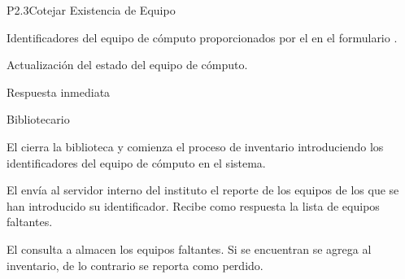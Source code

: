 \begin{Proceso}{P2.3}{Cotejar Existencia de Equipo}
   { %
  	\begin{UClist}
  		\UCli Identificadores del equipo de cómputo proporcionados por el  en el formulario . 
    \end {UClist}
  }
  
   { %
  }

   { %
    \begin{UClist}
		\UCli	Actualización del estado del equipo de cómputo.
    \end{UClist}
  }

   { %
  }

   { %
    \begin{UClist}
      \UCli Respuesta inmediata
    \end{UClist}
  }
   { %
  }


\end{Proceso}
\begin{PDescripcion}

  \Ppaso Bibliotecario
	\begin{enumerate}
		\Ppaso[\itarea]  El  cierra la biblioteca y comienza el proceso de inventario introduciendo los identificadores del equipo de cómputo en el sistema.
		
		\Ppaso[\itarea]  El  envía al servidor interno del instituto el reporte de los equipos de los que se han introducido su identificador. Recibe como respuesta la lista de equipos faltantes.
		
		\Ppaso[\itarea]  El  consulta a almacen los equipos faltantes. Si se encuentran se agrega al inventario, de lo contrario se reporta como perdido.
	\end{enumerate}
\end{PDescripcion}




